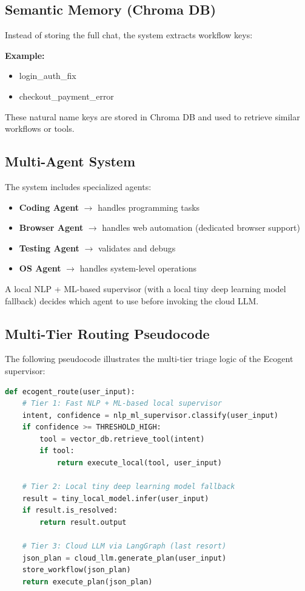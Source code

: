 \documentclass[12pt,a4paper]{article}
\begin{document}
\subsection{Semantic Memory (Chroma DB)}
Instead of storing the full chat, the system extracts workflow keys:

\textbf{Example:}
\begin{itemize}
    \item login\_auth\_fix
    \item checkout\_payment\_error
\end{itemize}
These natural name keys are stored in Chroma DB and used to retrieve similar workflows or tools.

\subsection{Multi-Agent System}
The system includes specialized agents:
\begin{itemize}
    \item \textbf{Coding Agent} $\rightarrow$ handles programming tasks
    \item \textbf{Browser Agent} $\rightarrow$ handles web automation (dedicated browser support)
    \item \textbf{Testing Agent} $\rightarrow$ validates and debugs
    \item \textbf{OS Agent} $\rightarrow$ handles system-level operations
\end{itemize}

A local NLP + ML-based supervisor (with a local tiny deep learning model fallback) decides which agent to use before invoking the cloud LLM.

\subsection{Multi-Tier Routing Pseudocode}
The following pseudocode illustrates the multi-tier triage logic of the Ecogent supervisor:

\begin{lstlisting}[language=Python, basicstyle=\footnotesize\ttfamily]
def ecogent_route(user_input):
    # Tier 1: Fast NLP + ML-based local supervisor
    intent, confidence = nlp_ml_supervisor.classify(user_input)
    if confidence >= THRESHOLD_HIGH:
        tool = vector_db.retrieve_tool(intent)
        if tool:
            return execute_local(tool, user_input)

    # Tier 2: Local tiny deep learning model fallback
    result = tiny_local_model.infer(user_input)
    if result.is_resolved:
        return result.output

    # Tier 3: Cloud LLM via LangGraph (last resort)
    json_plan = cloud_llm.generate_plan(user_input)
    store_workflow(json_plan)
    return execute_plan(json_plan)
\end{lstlisting}
\end{document}

